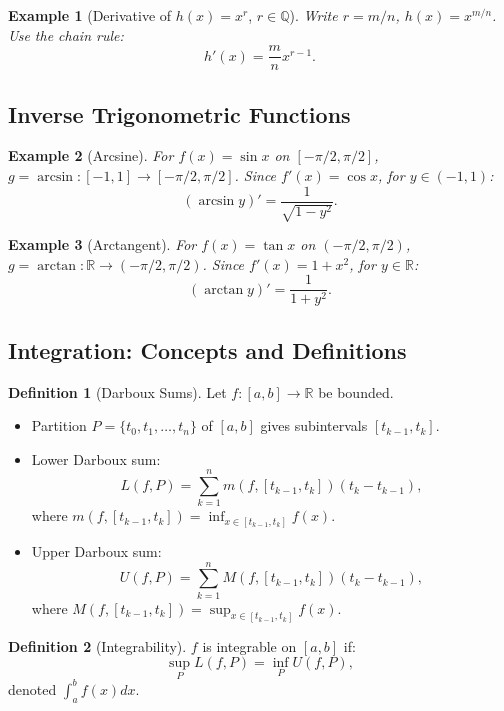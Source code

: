 \documentclass[9pt]{article}
\theoremstyle{definition}
\newtheorem{definition}{Definition}
\theoremstyle{plain}
\newtheorem{example}{Example}
\begin{document}
\begin{example}[Derivative of \( h(x) = x^r \), \( r \in \mathbb{Q} \)]
Write \( r = m/n \), \( h(x) = x^{m/n} \). Use the chain rule:
\[
h'(x) = \frac{m}{n} x^{r-1}.
\]
\end{example}

\subsection*{Inverse Trigonometric Functions}
\begin{example}[Arcsine]
For \( f(x) = \sin x \) on \( [-\pi/2, \pi/2] \), \( g = \arcsin : [-1, 1] \to [-\pi/2, \pi/2] \). Since \( f'(x) = \cos x \), for \( y \in (-1, 1) \):
\[
(\arcsin y)' = \frac{1}{\sqrt{1-y^2}}.
\]
\end{example}

\begin{example}[Arctangent]
For \( f(x) = \tan x \) on \( (-\pi/2, \pi/2) \), \( g = \arctan : \mathbb{R} \to (-\pi/2, \pi/2) \). Since \( f'(x) = 1 + x^2 \), for \( y \in \mathbb{R} \):
\[
(\arctan y)' = \frac{1}{1 + y^2}.
\]
\end{example}

\subsection*{Integration: Concepts and Definitions}
\begin{definition}[Darboux Sums]
Let \( f : [a, b] \to \mathbb{R} \) be bounded.
\begin{itemize}
    \item Partition \( P = \{t_0, t_1, \ldots, t_n\} \) of \( [a, b] \) gives subintervals \( [t_{k-1}, t_k] \).
    \item Lower Darboux sum:
    \[
    L(f, P) = \sum_{k=1}^n m(f, [t_{k-1}, t_k])(t_k - t_{k-1}),
    \]
    where \( m(f, [t_{k-1}, t_k]) = \inf_{x \in [t_{k-1}, t_k]} f(x) \).
    \item Upper Darboux sum:
    \[
    U(f, P) = \sum_{k=1}^n M(f, [t_{k-1}, t_k])(t_k - t_{k-1}),
    \]
    where \( M(f, [t_{k-1}, t_k]) = \sup_{x \in [t_{k-1}, t_k]} f(x) \).
\end{itemize}
\end{definition}

\begin{definition}[Integrability]
\( f \) is integrable on \( [a, b] \) if:
\[
\sup_P L(f, P) = \inf_P U(f, P),
\]
denoted \( \int_a^b f(x) dx \).
\end{definition}
\end{document}
